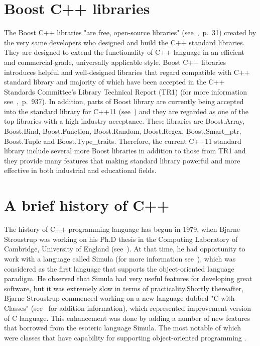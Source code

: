 \documentclass[11pt]{report}
\begin{document}
\section{Boost C++ libraries}
\label{sec: Boost}
The Boost C++ libraries "are free, open-source libraries" (see~\cite{Deitel:2012:CPP},~p.~31) created by the very same developers who designed and build the C++ standard libraries. They are designed to extend the functionality of C++ language in an efficient and commercial-grade, universally applicable style. Boost C++ libraries introduces helpful and well-designed libraries that regard compatible with C++ standard library and majority of which have been accepted in the C++ Standards Committee's Library Technical Report (TR1) (for more information see~\cite{Deitel:2012:CPP},~p.~937). In addition, parts of Boost library are currently being accepted into the standard library for C++11 (see~\cite{Boost:2007:Cpp}) and they are regarded as one of the top libraries with a high industry acceptance. These libraries are Boost.Array, Boost.Bind, Boost.Function, Boost.Random, Boost.Regex, Boost.Smart\_ptr, Boost.Tuple and Boost.Type\_traits. Therefore, the current C++11 standard library include several more Boost libraries in addition to those from TR1 and they provide many features that making standard library powerful and more effective in both industrial and educational fields.

\section{A brief history of C++}
\label{sec: History of C++}
The history of C++ programming language has begun in 1979, when Bjarne Stroustrup was working on his Ph.D thesis in the Computing Laboratory of Cambridge, University of England (see~\cite{StroustrupHistory}). At that time, he had opportunity to work with a language called Simula (for more information see~\cite{Stroustrup:2012:Cpp11}), which was considered as the first language that supports the object-oriented language paradigm. He observed that Simula had very useful features for developing great software, but it was extremely slow in terms of practicality.Shortly thereafter, Bjarne Stroustrup commenced working on a new language dubbed "C with Classes" (see~\cite{StroustrupHistory} for addition information), which represented improvement version of C language. This enhancement was done by adding a number of new features that borrowed from the esoteric language Simula. The most notable of which were classes that have capability for supporting object-oriented programming . 
\end{document}
